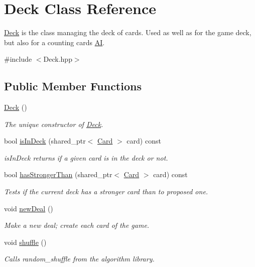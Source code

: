 \hypertarget{classDeck}{\section{Deck Class Reference}
\label{classDeck}
}


\hyperlink{classDeck}{Deck} is the class managing the deck of cards. Used as well as for the game deck, but also for a counting cards \hyperlink{classAI}{A\-I}.  




{\ttfamily \#include $<$Deck.\-hpp$>$}

\subsection*{Public Member Functions}
\begin{DoxyCompactItemize}
\item 
\hypertarget{classDeck_a57ae1cb4ac6fd61c249cefb2db85eb99}{\hyperlink{classDeck_a57ae1cb4ac6fd61c249cefb2db85eb99}{Deck} ()}\label{classDeck_a57ae1cb4ac6fd61c249cefb2db85eb99}

\begin{DoxyCompactList}\small\item\em The unique constructor of \hyperlink{classDeck}{Deck}. \end{DoxyCompactList}\item 
bool \hyperlink{classDeck_aaafdac9dd57ada20cc78dd330c741963}{is\-In\-Deck} (shared\-\_\-ptr$<$ \hyperlink{classCard}{Card} $>$ card) const 
\begin{DoxyCompactList}\small\item\em is\-In\-Deck returns if a given card is in the deck or not. \end{DoxyCompactList}\item 
bool \hyperlink{classDeck_a82a3371b10b8be7bc5fef6999a56bb88}{has\-Stronger\-Than} (shared\-\_\-ptr$<$ \hyperlink{classCard}{Card} $>$ card) const 
\begin{DoxyCompactList}\small\item\em Tests if the current deck has a stronger card than to proposed one. \end{DoxyCompactList}\item 
\hypertarget{classDeck_aec4d8d2a67f1c46a1a7f175b8848f5b6}{void \hyperlink{classDeck_aec4d8d2a67f1c46a1a7f175b8848f5b6}{new\-Deal} ()}\label{classDeck_aec4d8d2a67f1c46a1a7f175b8848f5b6}

\begin{DoxyCompactList}\small\item\em Make a new deal; create each card of the game. \end{DoxyCompactList}\item 
\hypertarget{classDeck_ae5a1e52ab00ae5924f2bc6b730dba3eb}{void \hyperlink{classDeck_ae5a1e52ab00ae5924f2bc6b730dba3eb}{shuffle} ()}\label{classDeck_ae5a1e52ab00ae5924f2bc6b730dba3eb}

\begin{DoxyCompactList}\small\item\em Calls random\-\_\-shuffle from the algorithm library. \end{DoxyCompactList}\end{DoxyCompactItemize}
